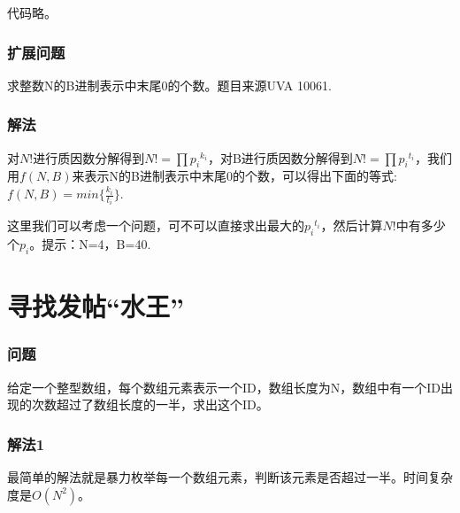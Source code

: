代码略。

\subsubsection{扩展问题}
求整数N的B进制表示中末尾0的个数。题目来源UVA 10061.

\subsubsection{解法}
对$N!$进行质因数分解得到$N!=\prod {p_i}^{k_i}$，对B进行质因数分解得到$N!=\prod {p_i}^{t_i}$，我们用$f(N,B)$来表示N的B进制表示中末尾0的个数，可以得出下面的等式:
$f(N,B) = min\{\frac{k_i}{t_i}\}$.
这里我们可以考虑一个问题，可不可以直接求出最大的${p_i}^{t_i}$，然后计算$N!$中有多少个${p_i}$。提示：N=4，B=40.

\section{寻找发帖“水王”} %
\label{sec:water-king}

\subsubsection{问题}
给定一个整型数组，每个数组元素表示一个ID，数组长度为N，数组中有一个ID出现的次数超过了数组长度的一半，求出这个ID。

\subsubsection{解法1}
最简单的解法就是暴力枚举每一个数组元素，判断该元素是否超过一半。时间复杂度是$O(N^2)$。

